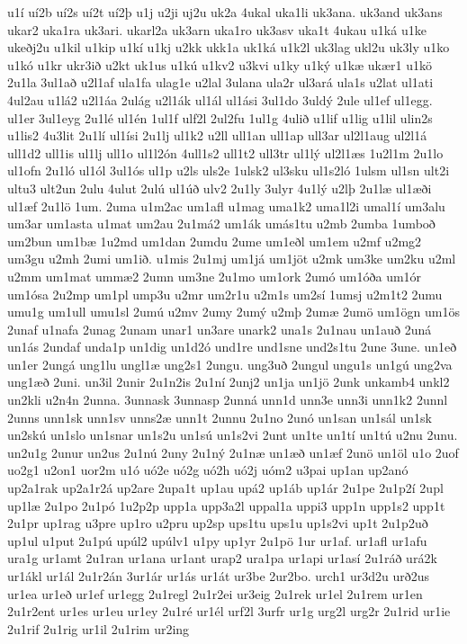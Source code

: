 {u1í
uí2b
uí2s
uí2t
uí2þ
u1j
u2ji
uj2u
uk2a
4ukal
uka1li
uk3ana.
uk3and
uk3ans
ukar2
uka1ra
uk3ari.
ukarl2a
uk3arn
uka1ro
uk3asv
uka1t
4ukau
u1ká
u1ke
ukeðj2u
u1kil
u1kip
u1kí
u1kj
u2kk
ukk1a
uk1ká
u1k2l
uk3lag
ukl2u
uk3ly
u1ko
u1kó
u1kr
ukr3ið
u2kt
uk1us
u1kú
u1kv2
u3kvi
u1ky
u1ký
u1kæ
ukær1
u1kö
2u1la
3ul1að
u2l1af
ula1fa
ulag1e
u2lal
3ulana
ula2r
ul3ará
ula1s
u2lat
ul1ati
4ul2au
u1lá2
u2l1áa
2ulág
u2l1ák
ul1ál
ul1ási
3ul1do
3uldý
2ule
ul1ef
ul1egg.
ul1er
3ul1eyg
2u1lé
ul1én
1ul1f
ulf2l
2ul2fu
1ul1g
4ulið
u1lif
u1lig
u1lil
ulin2s
u1lis2
4u3lit
2u1lí
ul1ísi
2u1lj
ul1k2
u2ll
ull1an
ull1ap
ull3ar
ul2l1aug
ul2l1á
ull1d2
ull1is
ul1lj
ull1o
ul1l2ón
4ull1s2
ull1t2
ull3tr
ul1lý
ul2l1æs
1u2l1m
2u1lo
ul1ofn
2u1ló
ul1ól
3ul1ós
ul1p
u2ls
uls2e
1ulsk2
ul3sku
ul1s2ló
1ulsm
ul1sn
ult2i
ultu3
ult2un
2ulu
4ulut
2ulú
ul1úð
ulv2
2u1ly
3ulyr
4u1lý
u2lþ
2u1læ
ul1æði
ul1æf
2u1lö
1um.
2uma
u1m2ac
um1afl
u1mag
uma1k2
uma1l2i
umal1í
um3alu
um3ar
um1asta
u1mat
um2au
2u1má2
um1ák
umás1tu
u2mb
2umba
1umboð
um2bun
um1bæ
1u2md
um1dan
2umdu
2ume
um1eðl
um1em
u2mf
u2mg2
um3gu
u2mh
2umi
um1ið.
u1mis
2u1mj
um1já
um1jöt
u2mk
um3ke
um2ku
u2ml
u2mm
um1mat
ummæ2
2umn
um3ne
2u1mo
um1ork
2umó
um1óða
um1ór
um1ósa
2u2mp
um1pl
ump3u
u2mr
um2r1u
u2m1s
um2sí
1umsj
u2m1t2
2umu
umu1g
um1ull
umu1sl
2umú
u2mv
2umy
2umý
u2mþ
2umæ
2umö
um1ögn
um1ös
2unaf
u1nafa
2unag
2unam
unar1
un3are
unark2
una1s
2u1nau
un1auð
2uná
un1ás
2undaf
unda1p
un1dig
un1d2ó
und1re
und1sne
und2s1tu
2une
3une.
un1eð
un1er
2ungá
ung1lu
ungl1æ
ung2s1
2ungu.
ung3uð
2ungul
ungu1s
un1gú
ung2va
ung1æð
2uni.
un3il
2unir
2u1n2is
2u1ní
2unj2
un1ja
un1jö
2unk
unkamb4
unkl2
un2kli
u2n4n
2unna.
3unnask
3unnasp
2unná
unn1d
unn3e
unn3i
unn1k2
2unnl
2unns
unn1sk
unn1sv
unns2æ
unn1t
2unnu
2u1no
2unó
un1san
un1sál
un1sk
un2skú
un1slo
un1snar
un1s2u
un1sú
un1s2vi
2unt
un1te
un1tí
un1tú
u2nu
2unu.
un2u1g
2unur
un2us
2u1nú
2uny
2u1ný
2u1næ
un1æð
un1æf
2unö
un1öl
u1o
2uof
uo2g1
u2on1
uor2m
u1ó
uó2e
uó2g
uó2h
uó2j
uóm2
u3pai
up1an
up2anó
up2a1rak
up2a1r2á
up2are
2upa1t
up1au
upá2
up1áb
up1ár
2u1pe
2u1p2í
2upl
up1læ
2u1po
2u1pó
1u2p2p
upp1a
upp3a2l
uppal1a
uppi3
upp1n
upp1s2
upp1t
2u1pr
up1rag
u3pre
up1ro
u2pru
up2sp
ups1tu
ups1u
up1s2vi
up1t
2u1p2uð
up1ul
u1put
2u1pú
upúl2
upúlv1
u1py
up1yr
2u1pö
1ur
ur1af.
ur1afl
ur1afu
ura1g
ur1amt
2u1ran
ur1ana
ur1ant
urap2
ura1pa
ur1api
ur1así
2u1ráð
urá2k
ur1ákl
ur1ál
2u1r2án
3ur1ár
ur1ás
ur1át
ur3be
2ur2bo.
urch1
ur3d2u
urð2us
ur1ea
ur1eð
ur1ef
ur1egg
2u1regl
2u1r2ei
ur3eig
2u1rek
ur1el
2u1rem
ur1en
2u1r2ent
ur1es
ur1eu
ur1ey
2u1ré
ur1él
urf2l
3urfr
ur1g
urg2l
urg2r
2u1rid
ur1ie
2u1rif
2u1rig
ur1il
2u1rim
ur2ing
}
